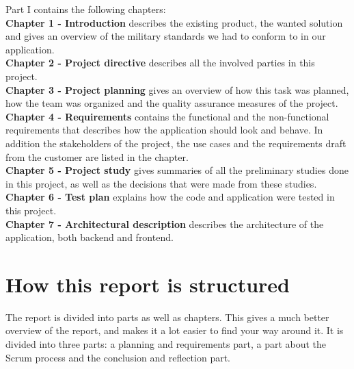 Part I contains the following chapters:\\
\textbf{Chapter 1 - Introduction} describes the existing product, the wanted solution and gives an \hspace*{4.3em} overview of the military standards we had to conform to in our application.\\
\textbf{Chapter 2 - Project directive} describes all the involved parties in this project.\\
\textbf{Chapter 3 - Project planning} gives an overview of how this task was planned, how the team \hspace*{4.3em} was organized and the quality assurance measures of the project. \\
\textbf{Chapter 4 - Requirements} contains the functional and the non-functional requirements that  \hspace*{4.3em} describes how the application should look and behave. In addition the stakeholders of \hspace*{4.3em} the project, the use cases and the requirements draft from the customer are listed in \hspace*{4.3em} the chapter. \\
\textbf{Chapter 5 - Project study} gives summaries of all the preliminary studies done in this project, \hspace*{4.3em} as well as the decisions that were made from these studies.\\
\textbf{Chapter 6 - Test plan} explains how the code and application were tested in this project.\\
\textbf{Chapter 7 - Architectural description} describes the architecture of the application, both \hspace*{4.3em} backend and frontend.\\

\section*{How this report is structured}
The report is divided into parts as well as chapters. This gives a much better overview of the report, and makes it a lot easier to find your way around it. It is divided into three parts: a planning and requirements part, a part about the Scrum process and the conclusion and reflection part.